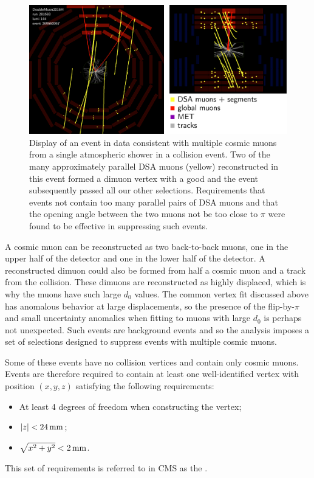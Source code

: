 \begin{figure}[htpb]
  \centering
  \includegraphics[width=\textwidth]{figures/displaced/ED_Cosmic.pdf}
  \caption[Display of an event in data consistent with multiple cosmic muons from a single atmospheric shower in a \pp collision event.]{Display of an event in data consistent with multiple cosmic muons from a single atmospheric shower in a \pp collision event. Two of the many approximately parallel DSA muons (yellow) reconstructed in this event formed a dimuon vertex with a good \vchisq and the event subsequently passed all our other selections. Requirements that events not contain too many parallel pairs of DSA muons and that the opening angle between the two muons not be too close to $\pi$ were found to be effective in suppressing such events.}
  \label{fig:dd:shower}
\end{figure}

A cosmic muon can be reconstructed as two back-to-back muons, one in the upper half of the detector and one in the lower half of the detector.
A reconstructed dimuon could also be formed from half a cosmic muon and a track from the \pp collision.
These dimuons are reconstructed as highly displaced, which is why the muons have such large $d_0$ values.
The common vertex fit discussed above has anomalous behavior at large displacements, so the presence of the flip-by-$\pi$ and small \pT uncertainty anomalies when fitting to muons with large $d_0$ is perhaps not unexpected.
Such events are background events and so the analysis imposes a set of selections designed to suppress events with multiple cosmic muons.

Some of these events have no \pp collision vertices and contain only cosmic muons.
Events are therefore required to contain at least one well-identified vertex with position $(x, y, z)$ satisfying the following requirements:
\pagebreak
\begin{itemize}
  \item At least 4 degrees of freedom when constructing the vertex;
  \item $|z| < 24\,\text{mm}$;
  \item $\sqrt{x^2 + y^2} < 2\,\text{mm}$.
\end{itemize}
This set of requirements is referred to in CMS as the .

